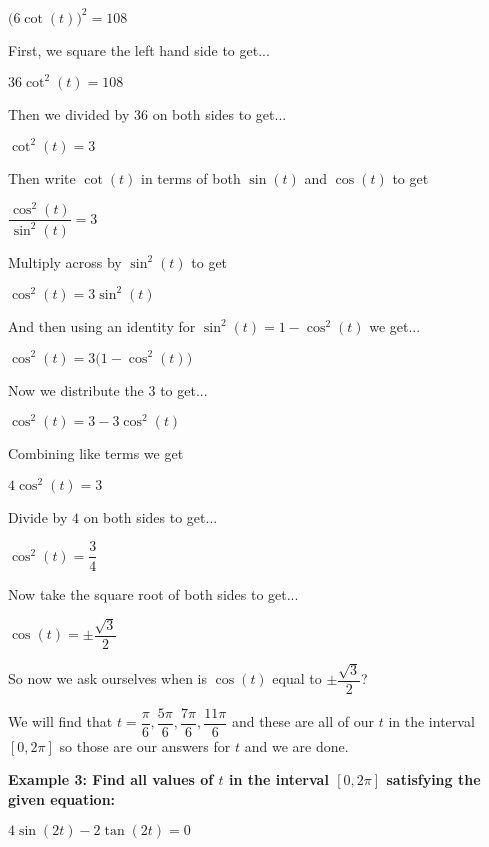 \documentclass[12pt]{article}
\begin{document}
\centerline{$\Big(6\cot(t)\Big)^2 = 108$}

First, we square the left hand side to get...
\newline

\centerline{$36\cot^{2}(t) = 108$}

Then we divided by $36$ on both sides to get...
\newline

\centerline{$\cot^{2}(t) = 3$}

Then write $\cot(t)$ in terms of both $\sin(t)$ and $\cos(t)$ to get
\newline

\centerline{$\dfrac{\cos^{2}(t)}{\sin^{2}(t)} = 3$}

Multiply across by $\sin^{2}(t)$ to get
\newline

\centerline{$\cos^{2}(t) = 3\sin^{2}(t)$}

And then using an identity for $\sin^{2}(t) = 1 - \cos^{2}(t)$ we get...
\newline

\centerline{$\cos^{2}(t) = 3\Big(1 - \cos^{2}(t)\Big)$}

Now we distribute the 3 to get...
\newline

\centerline{$\cos^{2}(t) = 3 - 3\cos^{2}(t)$}

Combining like terms we get
\newline

\centerline{$4\cos^{2}(t) = 3$}

Divide by $4$ on both sides to get...
\newline

\centerline{$\cos^{2}(t) = \dfrac{3}{4}$}

Now take the square root of both sides to get...

\centerline{$\cos(t) = \pm \dfrac{\sqrt{3}}{2}$}

So now we ask ourselves when is $\cos(t)$ equal to $\pm \dfrac{\sqrt{3}}{2}$?

We will find that $t = \dfrac{\pi}{6}, \dfrac{5\pi}{6}, \dfrac{7\pi}{6}, \dfrac{11\pi}{6}$ and these are all of our $t$ in the interval $[0, 2\pi]$ so those are our answers for $t$ and we are done.

\textbf{Example 3: Find all values of $t$ in the interval $[0, 2\pi]$ satisfying the given equation:}
\newline

\centerline{$4\sin(2t) - 2\tan(2t) = 0$}
\end{document}
